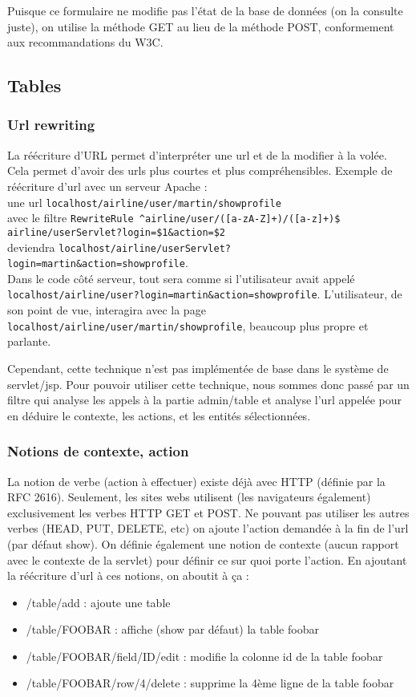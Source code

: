 Puisque ce formulaire ne modifie pas l'état de la base de données (on la consulte juste), on utilise la méthode GET au lieu de la méthode POST, conformement aux recommandations du W3C.

\subsection{Tables}

\subsubsection{Url rewriting}
La réécriture d'URL permet d'interpréter une url et de la modifier à la volée. Cela permet d'avoir des urls plus courtes et plus compréhensibles. Exemple de réécriture d'url avec un serveur Apache :
~\\
une url \verb|localhost/airline/user/martin/showprofile|\\
avec le filtre \verb|RewriteRule ^airline/user/([a-zA-Z]+)/([a-z]+)$ airline/userServlet?login=$1&action=$2|\\
 deviendra \verb|localhost/airline/userServlet?login=martin&action=showprofile|.\\
Dans le code côté serveur, tout sera comme si l'utilisateur avait appelé \verb|localhost/airline/user?login=martin&action=showprofile|. L'utilisateur, de son point de vue, interagira avec la page \verb|localhost/airline/user/martin/showprofile|, beaucoup plus propre et parlante.

Cependant, cette technique n'est pas implémentée de base dans le système de servlet/jsp. Pour pouvoir utiliser cette technique, nous sommes donc passé par un filtre qui analyse les appels à la partie admin/table et analyse l'url appelée pour en déduire le contexte, les actions, et les entités sélectionnées.

\subsubsection{Notions de contexte, action}
La notion de verbe (action à effectuer) existe déjà avec HTTP (définie par la RFC 2616). Seulement, les sites webs utilisent (les navigateurs également) exclusivement les verbes HTTP GET et POST. Ne pouvant pas utiliser les autres verbes (HEAD, PUT, DELETE, etc) on ajoute l'action demandée à la fin de l'url (par défaut show). On définie également une notion de contexte (aucun rapport avec le contexte de la servlet) pour définir ce sur quoi porte l'action. En ajoutant la réécriture d'url à ces notions, on aboutit à ça :
\begin{itemize}
	\item{/table/add} : ajoute une table
	\item{/table/FOOBAR} : affiche (show par défaut) la table foobar
	\item{/table/FOOBAR/field/ID/edit} : modifie la colonne id de la table foobar
	\item{/table/FOOBAR/row/4/delete} :  supprime la 4ème ligne de la table foobar
\end{itemize}

